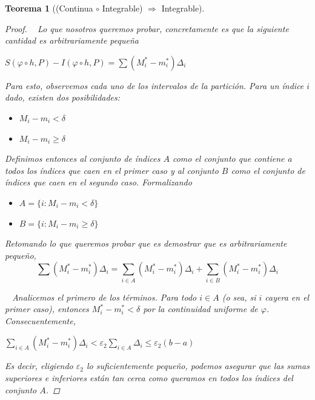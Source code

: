 \documentclass[]{article}
\newtheorem{teo}{Teorema}
\def\e{\varepsilon}
\begin{document}
\begin{teo}[(Continua $\circ$ Integrable) $\Rightarrow$ Integrable]
\begin{proof}
		~\newline
		Lo que nosotros queremos probar, concretamente es que la siguiente cantidad es arbitrariamente pequeña
		\begin{center}
			$\displaystyle S(\varphi \circ h,P) - I(\varphi \circ h,P) = \sum (M^*_i - m^*_i)\Delta_i$
		\end{center}
		Para esto, observemos cada uno de los intervalos de la partición. Para un índice $i$ dado, existen dos posibilidades:
		\begin{itemize}
			\item $M_i-m_i<\delta$
			\item $M_i-m_i\geq\delta$
		\end{itemize}
		Definimos entonces al conjunto de índices $A$ como el conjunto que contiene a todos los índices que caen en el primer caso y al conjunto $B$ como el conjunto de índices que caen en el segundo caso. Formalizando
		\begin{itemize}
			\item $A = \{i:M_i-m_i<\delta\}$
			\item $B = \{i:M_i-m_i\geq\delta\}$
		\end{itemize}
		Retomando lo que queremos probar que es demostrar que es arbitrariamente pequeño, 
		\begin{equation}\label{COSOO}
			\displaystyle \sum (M^*_i - m^*_i)\Delta_i = \sum_{i\in A}(M^*_i - m^*_i)\Delta_i + \sum_{i\in B}(M^*_i - m^*_i)\Delta_i
		\end{equation}
		
		~\newline
		Analicemos el primero de los términos. Para todo $i\in A$ (o sea, si $i$ cayera en el primer caso), entonces $M^*_i-m^*_i<\delta$ por la continuidad uniforme de $\varphi$. Consecuentemente,
		\begin{center}
			$\displaystyle \sum_{i\in A}(M^*_i-m^*_i)\Delta_i < \e_2\sum_{i\in A}\Delta_i\leq\e_2(b-a)$
		\end{center}
		Es decir, eligiendo $\e_2$ lo suficientemente pequeño, podemos asegurar que las sumas superiores e inferiores están tan cerca como queramos en todos los índices del conjunto $A$.
		

\end{proof}
\end{teo}
\end{document}
